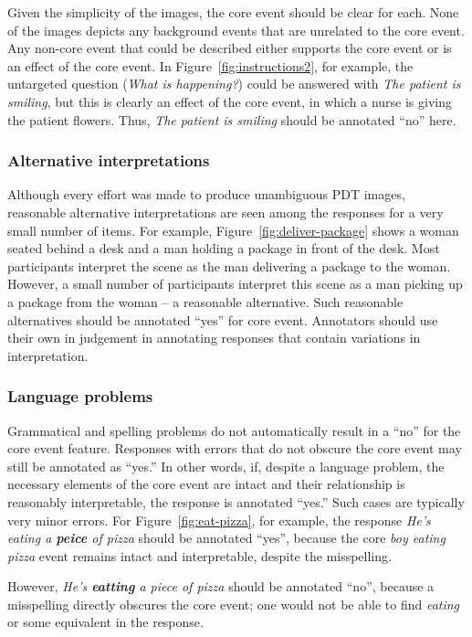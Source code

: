 \documentclass[12pt,notitlepage]{article}
\newcommand{\lk}[1]{\marginpar{\linespread{1}\scriptsize LK: #1}}
\begin{document}
Given the simplicity of the images, the core event should be clear for each. None of the images depicts any background events that are unrelated to the core event. Any non-core event that could be described either supports the core event or is an effect of the core event. In Figure~\ref{fig:instructions2}, for example, the untargeted question (\textit{What is happening?}) could be answered with \textit{The patient is smiling}, but this is clearly an effect of the core event, in which a nurse is giving the patient flowers. Thus, \textit{The patient is smiling} should be annotated ``no'' here.

\subsubsection{Alternative interpretations} Although every effort was made to produce unambiguous PDT images, reasonable alternative interpretations are seen among the responses for a very small number of items. For example, Figure~\ref{fig:deliver-package} shows a woman seated behind a desk and a man holding a package in front of the desk. Most participants interpret the scene as the man delivering a package to the woman. However, a small number of participants interpret this scene as a man picking up a package from the woman -- a reasonable alternative. Such reasonable alternatives should be annotated ``yes'' for core event. Annotators should use their own in judgement in annotating responses that contain variations in interpretation.

\subsubsection{Language problems} Grammatical and spelling problems do not automatically result in a ``no'' for the core event feature. Responses with errors that do not obscure the core event may still be annotated as ``yes.'' In other words, if, despite a language problem, the necessary elements of the core event are intact and their relationship is reasonably interpretable, the response is annotated ``yes.'' Such cases are typically very minor errors. For Figure~\ref{fig:eat-pizza}, for example, the response \textit{He's eating a \textbf{peice} of pizza} should be annotated ``yes'', because the core \textit{boy eating pizza} event remains intact and interpretable, despite the misspelling. 

\lk{Scrap this?} However, \textit{He's \textbf{eatting} a piece of pizza} should be annotated ``no'', because a misspelling directly obscures the core event; one would not be able to find \textit{eating} or some equivalent in the response.
\end{document}
